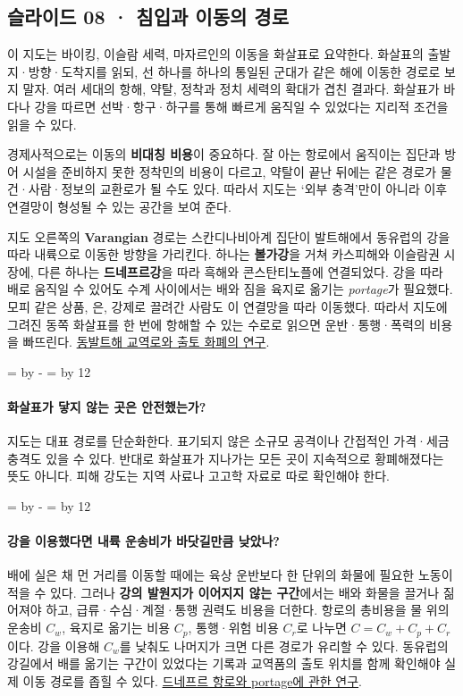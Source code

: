 \documentclass[10pt,a4paper]{article}
\newcommand{\ReserveQuestionSpace}{%
  \par\begingroup
  \dimen0=\pagegoal \advance\dimen0 by -\pagetotal
  \dimen2=\baselineskip \multiply\dimen2 by 12
  \ifdim\dimen0<\dimen2 \newpage\fi
  \endgroup}
\begin{document}
\subsection{슬라이드 08 · 침입과 이동의 경로}
이 지도는 바이킹, 이슬람 세력, 마자르인의 이동을 화살표로 요약한다. 화살표의 출발지·방향·도착지를 읽되, 선 하나를 하나의 통일된 군대가 같은 해에 이동한 경로로 보지 말자. 여러 세대의 항해, 약탈, 정착과 정치 세력의 확대가 겹친 결과다. 화살표가 바다나 강을 따르면 선박·항구·하구를 통해 빠르게 움직일 수 있었다는 지리적 조건을 읽을 수 있다.\par

경제사적으로는 이동의 \textbf{비대칭 비용}이 중요하다. 잘 아는 항로에서 움직이는 집단과 방어 시설을 준비하지 못한 정착민의 비용이 다르고, 약탈이 끝난 뒤에는 같은 경로가 물건·사람·정보의 교환로가 될 수도 있다. 따라서 지도는 ‘외부 충격’만이 아니라 이후 연결망이 형성될 수 있는 공간을 보여 준다.\par

지도 오른쪽의 \textbf{Varangian} 경로는 스칸디나비아계 집단이 발트해에서 동유럽의 강을 따라 내륙으로 이동한 방향을 가리킨다. 하나는 \textbf{볼가강}을 거쳐 카스피해와 이슬람권 시장에, 다른 하나는 \textbf{드네프르강}을 따라 흑해와 콘스탄티노플에 연결되었다. 강을 따라 배로 움직일 수 있어도 수계 사이에서는 배와 짐을 육지로 옮기는 \emph{portage}가 필요했다. 모피 같은 상품, 은, 강제로 끌려간 사람도 이 연결망을 따라 이동했다. 따라서 지도에 그려진 동쪽 화살표를 한 번에 항해할 수 있는 수로로 읽으면 운반·통행·폭력의 비용을 빠뜨린다. \href{https://www.cambridge.org/core/books/viking-eastern-baltic/3A86B63E4D9B48FE994E817635B86B48/listing}{동발트해 교역로와 출토 화폐의 연구}.\par

\ReserveQuestionSpace
\paragraph{화살표가 닿지 않는 곳은 안전했는가?}
지도는 대표 경로를 단순화한다. 표기되지 않은 소규모 공격이나 간접적인 가격·세금 충격도 있을 수 있다. 반대로 화살표가 지나가는 모든 곳이 지속적으로 황폐해졌다는 뜻도 아니다. 피해 강도는 지역 사료나 고고학 자료로 따로 확인해야 한다.\par

\ReserveQuestionSpace
\paragraph{강을 이용했다면 내륙 운송비가 바닷길만큼 낮았나?}
배에 실은 채 먼 거리를 이동할 때에는 육상 운반보다 한 단위의 화물에 필요한 노동이 적을 수 있다. 그러나 \textbf{강의 발원지가 이어지지 않는 구간}에서는 배와 화물을 끌거나 짊어져야 하고, 급류·수심·계절·통행 권력도 비용을 더한다. 항로의 총비용을 물 위의 운송비 $C_w$, 육지로 옮기는 비용 $C_p$, 통행·위험 비용 $C_r$로 나누면 $C=C_w+C_p+C_r$이다. 강을 이용해 $C_w$를 낮춰도 나머지가 크면 다른 경로가 유리할 수 있다. 동유럽의 강길에서 배를 옮기는 구간이 있었다는 기록과 교역품의 출토 위치를 함께 확인해야 실제 이동 경로를 좁힐 수 있다. \href{https://assets.cambridge.org/052177/0173/sample/0521770173wsc00.pdf}{드네프르 항로와 portage에 관한 연구}.\par
\end{document}
